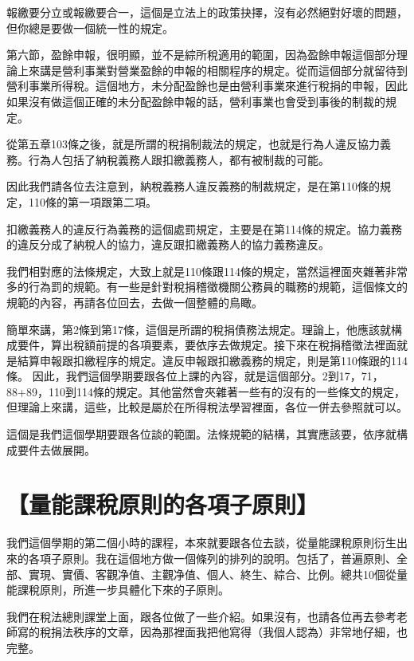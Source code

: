 \documentclass[]{ctexbook}
\begin{document}
報繳要分立或報繳要合一，這個是立法上的政策抉擇，沒有必然絕對好壞的問題，但你總是要做一個統一性的規定。

第六節，盈餘申報，很明顯，並不是綜所稅適用的範圍，因為盈餘申報這個部分理論上來講是營利事業對營業盈餘的申報的相關程序的規定。從而這個部分就留待到營利事業所得稅。這個地方，未分配盈餘也是由營利事業來進行稅捐的申報，因此如果沒有做這個正確的未分配盈餘申報的話，營利事業也會受到事後的制裁的規定。

從第五章103條之後，就是所謂的稅捐制裁法的規定，也就是行為人違反協力義務。行為人包括了納稅義務人跟扣繳義務人，都有被制裁的可能。

因此我們請各位去注意到，納稅義務人違反義務的制裁規定，是在第110條的規定，110條的第一項跟第二項。

扣繳義務人的違反行為義務的這個處罰規定，主要是在第114條的規定。協力義務的違反分成了納稅人的協力，違反跟扣繳義務人的協力義務違反。

我們相對應的法條規定，大致上就是110條跟114條的規定，當然這裡面夾雜著非常多的行為罰的規範。有一些是針對稅捐稽徵機關公務員的職務的規範，這個條文的規範的內容，再請各位回去，去做一個整體的鳥瞰。

簡單來講，第2條到第17條，這個是所謂的稅捐債務法規定。理論上，他應該就構成要件，算出稅額前提的各項要素，要依序去做規定。接下來在稅捐稽徵法裡面就是結算申報跟扣繳程序的規定。違反申報跟扣繳義務的規定，則是第110條跟的114條。
因此，我們這個學期要跟各位上課的內容，就是這個部分。2到17，71，88+89，110到114條的規定。其他當然會夾雜著一些有的沒有的一些條文的規定，但理論上來講，這些，比較是屬於在所得稅法學習裡面，各位一併去參照就可以。

這個是我們這個學期要跟各位談的範圍。法條規範的結構，其實應該要，依序就構成要件去做展開。

\hypertarget{ux91cfux80fdux8ab2ux7a05ux539fux5247ux7684ux5404ux9805ux5b50ux539fux5247}{%
\section{【量能課稅原則的各項子原則】}\label{ux91cfux80fdux8ab2ux7a05ux539fux5247ux7684ux5404ux9805ux5b50ux539fux5247}}

我們這個學期的第二個小時的課程，本來就要跟各位去談，從量能課稅原則衍生出來的各項子原則。我在這個地方做一個條列的排列的說明。包括了，普遍原則、全部、實現、實價、客觀净值、主觀净值、個人、終生、綜合、比例。總共10個從量能課稅原則，所進一步具體化下來的子原則。

我們在稅法總則課堂上面，跟各位做了一些介紹。如果沒有，也請各位再去參考老師寫的稅捐法秩序的文章，因為那裡面我把他寫得（我個人認為）非常地仔細，也完整。
\end{document}
